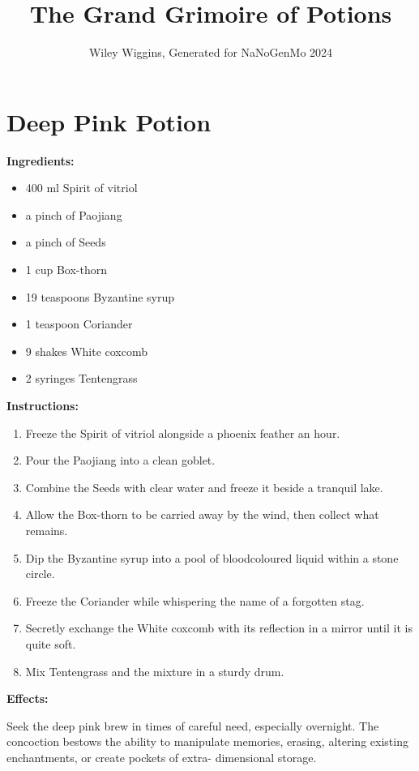 \documentclass{article}
\title{The Grand Grimoire of Potions}
\author{Wiley Wiggins, Generated for NaNoGenMo 2024}
\date{}
\begin{document}
\maketitle

\newpage
\section*{Deep Pink Potion}

\textbf{Ingredients:}

\begin{itemize}
  \item 400 ml Spirit of vitriol
  \item a pinch of Paojiang
  \item a pinch of Seeds
  \item 1 cup Box-thorn
  \item 19 teaspoons Byzantine syrup
  \item 1 teaspoon Coriander
  \item 9 shakes White coxcomb
  \item 2 syringes Tentengrass
\end{itemize}

\textbf{Instructions:}

\begin{enumerate}
  \item Freeze the Spirit of vitriol alongside a phoenix feather an hour.
  \item Pour the Paojiang into a clean goblet.
  \item Combine the Seeds with clear water and freeze it beside a tranquil lake.
  \item Allow the Box-thorn to be carried away by the wind, then collect what remains.
  \item Dip the Byzantine syrup into a pool of bloodcoloured liquid within a stone circle.
  \item Freeze the Coriander while whispering the name of a forgotten stag.
  \item Secretly exchange the White coxcomb with its reflection in a mirror until it is quite soft.
  \item Mix Tentengrass and the mixture in a sturdy drum.
\end{enumerate}

\textbf{Effects:}

Seek the deep pink brew in times of careful need, especially overnight. The concoction bestows the ability to manipulate memories, erasing, altering existing enchantments, or create pockets of extra- dimensional storage.
\end{document}
